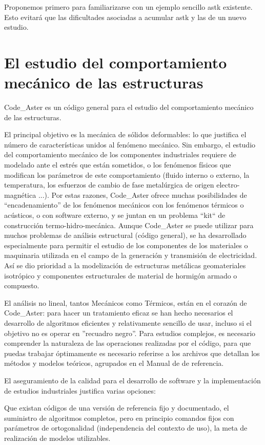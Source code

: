 \documentclass[12pt]{book}
\theoremstyle{definition}
\theoremstyle{remark}
\theoremstyle{plain}
\begin{document}
Proponemos primero para familiarizarse con un ejemplo sencillo astk existente. Esto
 evitará que las dificultades asociadas a acumular astk y las de un nuevo estudio.

\section{El estudio del comportamiento mecánico de las estructuras}
Code\_Aster es un código general para el estudio del comportamiento mecánico
 de las estructuras.

El principal objetivo es la mecánica de sólidos deformables: lo que justifica 
el número de características unidos al fenómeno mecánico. Sin embargo, el estudio 
del comportamiento mecánico de los componentes industriales requiere de modelado
 ante el estrés que están sometidos, o los fenómenos físicos que modifican 
los parámetros de este comportamiento (fluido interno o externo, la temperatura, 
los esfuerzos de cambio de fase metalúrgica de origen electro-magnética ...). Por 
estas razones, Code\_Aster ofrece muchas posibilidades de ``encadenamiento'' de los 
fenómenos mecánicos con los fenómenos térmicos o acústicos, o con software externo,
 y se juntan en un problema ``kit`` de construcción termo-hidro-mecánica. Aunque 
Code\_Aster se puede utilizar para muchos problemas de análisis estructural 
(código general), se ha desarrollado especialmente para permitir el estudio de 
los componentes de los materiales o maquinaria utilizada en el campo de la 
generación y transmisión de electricidad. Así se dio prioridad a la modelización 
de estructuras metálicas geomateriales isotrópico y componentes estructurales de 
material de hormigón armado o compuesto.

El análisis no lineal, tantos Mecánicos como Térmicos, están en el corazón de 
Code\_Aster: para hacer un tratamiento eficaz se han hecho necesarios el 
desarrollo de algoritmos eficientes y relativamente sencillo de usar, incluso 
si el objetivo no es operar en ''recuadro negro''. Para estudios complejos, es 
necesario comprender la 
naturaleza de las operaciones realizadas por el código, para que puedas trabajar
 óptimamente es necesario referirse a los archivos que detallan los métodos y
 modelos teóricos, agrupados en el Manual de de referencia.

El aseguramiento de la calidad para el desarrollo de software y la implementación 
de estudios industriales justifica varias opciones:

Que existan códigos de una versión de referencia fijo y documentado, el suministro
 de algoritmos completos, pero en principio comandos fijos con parámetros de 
ortogonalidad (independencia del contexto de uso), la meta de realización de 
modelos utilizables.
\end{document}
